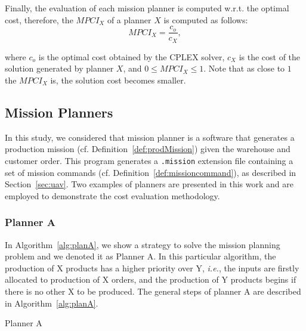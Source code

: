 \documentclass[conference,harvard,brazil,english]{sbatex}
\begin{document}
Finally, the evaluation of each mission planner is computed w.r.t. the optimal cost, therefore, the $MPCI_{X}$ of a planner $X$ is computed as follows:
%
\begin{equation}
\label{eq:MPCI}
	MPCI_X=\frac{c_o}{c_X},
\end{equation}

\noindent where $c_o$ is the optimal cost obtained by the CPLEX solver, \textbf{$c_X$} is the cost of the solution generated by planner $X$, and $0 \leq MPCI_X \leq 1$. Note that as close to $1$ the $MPCI_X$ is, the solution cost becomes smaller.

\subsection{Mission Planners}

In this study, we considered that mission planner is a software that generates a production mission (cf. Definition~\ref{def:prodMission}) given the warehouse and customer order. This program generates a \texttt{.mission} extension file containing a set of mission commands (cf. Definition~\ref{def:missioncommand}), as described in Section~\ref{sec:uav}. Two examples of planners are presented in this work and are employed to demonstrate the cost evaluation methodology.

\subsubsection{Planner A}

In Algorithm~\ref{alg:planA}, we show a strategy to solve the mission planning problem and we denoted it as Planner A. In this particular algorithm, the production of X products has a higher priority over Y, {\it i.e.}, the inputs are firstly allocated to production of X orders, and the production of Y products begins if there is no other X to be produced. The general steps of planner A are described in Algorithm~\ref{alg:planA}.
%
\begin{algorithm}[ht]
\scriptsize
{}
\captionsetup{list=no}
\caption{Planner A}\label{alg:planA}
\end{algorithm}
\end{document}
